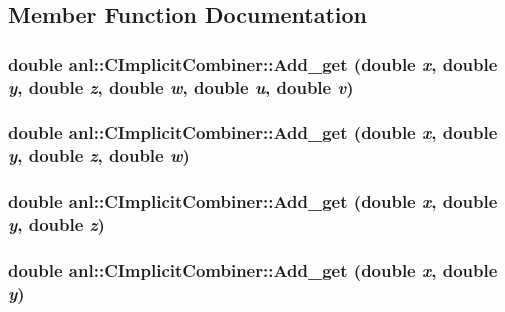 \subsection{Member Function Documentation}
\hypertarget{classanl_1_1CImplicitCombiner_a67b6275bd5fb2bce182b1ea8afe3be9e}{
\subsubsection[{Add\_\-get}]{\setlength{\rightskip}{0pt plus 5cm}double anl::CImplicitCombiner::Add\_\-get (double {\em x}, \/  double {\em y}, \/  double {\em z}, \/  double {\em w}, \/  double {\em u}, \/  double {\em v})}}
\label{classanl_1_1CImplicitCombiner_a67b6275bd5fb2bce182b1ea8afe3be9e}
\hypertarget{classanl_1_1CImplicitCombiner_ab6d3f553b52494d2de3a7ae187c8e720}{
\subsubsection[{Add\_\-get}]{\setlength{\rightskip}{0pt plus 5cm}double anl::CImplicitCombiner::Add\_\-get (double {\em x}, \/  double {\em y}, \/  double {\em z}, \/  double {\em w})}}
\label{classanl_1_1CImplicitCombiner_ab6d3f553b52494d2de3a7ae187c8e720}
\hypertarget{classanl_1_1CImplicitCombiner_a2becb9262b88f3a978097dd35d2e39b8}{
\subsubsection[{Add\_\-get}]{\setlength{\rightskip}{0pt plus 5cm}double anl::CImplicitCombiner::Add\_\-get (double {\em x}, \/  double {\em y}, \/  double {\em z})}}
\label{classanl_1_1CImplicitCombiner_a2becb9262b88f3a978097dd35d2e39b8}
\hypertarget{classanl_1_1CImplicitCombiner_a226d15de3528d906080a7ab7baeaf32c}{
\subsubsection[{Add\_\-get}]{\setlength{\rightskip}{0pt plus 5cm}double anl::CImplicitCombiner::Add\_\-get (double {\em x}, \/  double {\em y})}}

